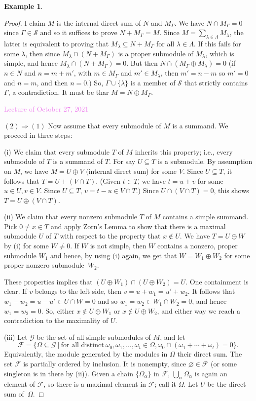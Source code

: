 \documentclass{amsart}[12pt]
\def\cS{\mathcal S}
\def\sF{\mathscr  F}
\def\sG{\mathscr G}
\newcommand{\Oct}[1]{\textcolor{violet}{Lecture of October #1, 2021}}
\numberwithin{equation}{section}
\theoremstyle{plain} %
\theoremstyle{definition}
\newtheorem{ex}[equation]{Example}
\theoremstyle{remark}
\begin{document}
\begin{ex}
\begin{proof}
  I claim $M$ is the internal direct sum of $N$ and $M_\Gamma$.
  We have $N \cap M_\Gamma = 0$ since $\Gamma\in\cS$ and so  it suffices to prove $N + M_\Gamma = M$. Since $M = \sum_{\lambda \in \Lambda} M_\lambda$, the latter is equivalent to proving
  that $M_\lambda \subseteq N + M_\Gamma$ for all $\lambda \in \Lambda$. If this fails for some $\lambda$, then since
$M_\lambda \cap (N + M_\Gamma)$ is a proper submodule of $M_\lambda$, which is simple, and hence 
$M_\lambda \cap (N + M_\Gamma) = 0$. But then $N \cap (M_{\Gamma} \oplus M_\lambda) = 0$ (if $n \in N$ and $n = m + m'$, with $m\in M_\Gamma$ and $m'\in M_\lambda$, then $m'=n-m$ so $m'=0$ and $n=m$, and then $n=0$.) So, $\Gamma\cup\{ \lambda\}$ is a member of $\cS$ that strictly contains $\Gamma$, a contradiction.
It must be thar $M = N \oplus M_\Gamma$.

\Oct{27}

$(2) \Rightarrow (1)$  Now assume that every submodule of $M$ is a summand. We proceed in three steps:

(i) We claim that every submodule $T$ of $M$  inherits this property; i.e., every submodule of $T$ is a summand of $T$.
For say $U \subseteq T$ is a submodule. By assumption on $M$, we have $M = U \oplus V$ (internal direct sum) for some $V$.  
Since $U \subseteq T$, it follows that  $T = U + (V \cap T)$. (Given $t \in T$, we have $t  =  u +v$ for some $u \in U, v \in V$. Since $U \subseteq T$, $v =
t-u \in V \cap T$.) Since $U \cap (V \cap T) = 0$, this shows $T = U \oplus (V \cap T)$. 


(ii) We claim that every nonzero submodule $T$ of $M$ contains a simple summand. Pick $0 \ne x \in T$ and apply Zorn's Lemma to show 
that there is a maximal submodule $U$ of $T$ with respect to the property that $x \notin U$. We have $T = U \oplus W$ by (i) for some  $W \neq 0$.
If $W$ is not
simple, then $W$ contains a nonzero, proper submodule $W_1$ and hence, by using (i) again, we get that 
$W = W_1 \oplus W_2$ for some proper nonzero submodule~$W_2$. 


These properties implies that $(U \oplus W_1) \cap (U \oplus W_2) = U$. One containment is clear. If $v$ belongs to the left side,
then $v = u + w_1 = u' + w_2$. It follows that
$w_1 - w_2 = u - u' \in U \cap W = 0$ and so $w_1 = w_2 \in W_1 \cap W_2 = 0$, and hence $w_1  = w_2 = 0$. 
So, either $x \notin U \oplus W_1$ or $x \notin U \oplus W_2$, and either way we reach a  contradiction to the maximality of $U$. 

(iii) Let $\sG$ be the set of all simple submodules of $M$, and let 
\[\sF= \{ \Omega \subseteq \sG \ | \ \textrm{for all distinct} \ \omega_0, \omega_1, \dots, \omega_t \in \Omega, \omega_0 \cap (\omega_1 + \cdots + \omega_t) = 0\}.\]
Equivalently, the module generated by the modules in $\Omega$ their direct sum.
The set $\sF$ is partially ordered by inclusion. It is nonempty, since $\varnothing \in \sF$ (or some singleton is in there by (ii)). Given a chain $\{ \Omega_\alpha\}$ in $\sF$, $\bigcup_\alpha \Omega_\alpha$ is again an element of $\sF$, so there is a maximal element in $\sF$; call it $\Omega$. Let $U$ be the direct sum of~$\Omega$.


\end{proof}
\end{ex}
\end{document}
